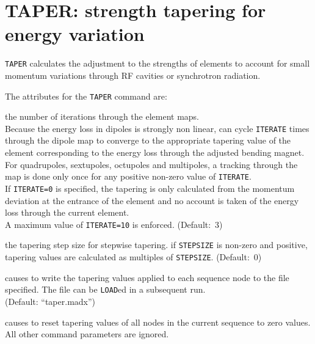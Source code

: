 
\chapter{TAPER: strength tapering for energy variation}
\label{chap:taper}

\texttt{TAPER} calculates the adjustment to the strengths of elements to
account for small momentum variations through RF cavities or synchrotron
radiation. 


The attributes for the \texttt{TAPER} command are: 
\begin{madlist}
   the number of iterations through the element maps. \\
  Because the energy loss in dipoles is strongly non linear, \madx
  can cycle \texttt{ITERATE} times through the dipole map to converge to the 
  appropriate tapering value of the element corresponding to the energy
  loss through the adjusted bending magnet.  \\
  For quadrupoles, sextupoles, octupoles and multipoles, a tracking
  through the map is done only once for any positive non-zero value of
  \texttt{ITERATE}. \\  
  If \texttt{ITERATE=0} is specified, the tapering is only calculated
  from the momentum deviation at the entrance of the element and no
  account is taken of the energy loss through the current element. \\
  A maximum value of \texttt{ITERATE=10} is enforced. (Default:~3)
  
   the tapering step size for stepwise tapering. if
  \texttt{STEPSIZE} is non-zero and positive, tapering values are
  calculated as multiples of \texttt{STEPSIZE}. (Default:~0)  
  
   causes \madx to write the tapering values applied to
  each sequence node to the file specified. The file can be
  \texttt{LOAD}ed in a subsequent \madx run. \\
  (Default: ``taper.madx'') 

   causes \madx to reset tapering values of all nodes
  in the current sequence to zero values. All other command parameters
  are ignored. 
  
\end{madlist}

